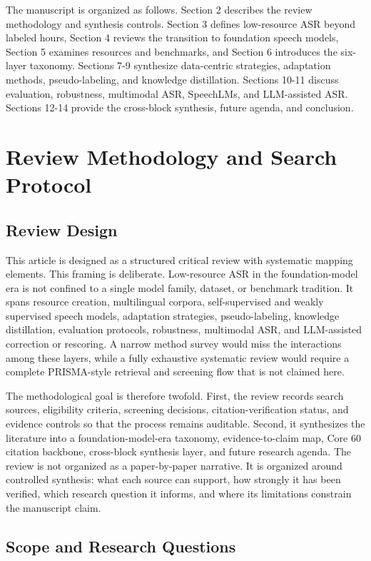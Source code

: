 \documentclass[pdflatex,sn-basic]{sn-jnl}
\theoremstyle{thmstyleone}
\theoremstyle{thmstyletwo}
\theoremstyle{thmstylethree}
\begin{document}
The manuscript is organized as follows. Section 2 describes the review methodology and synthesis controls. Section 3 defines low-resource ASR beyond labeled hours, Section 4 reviews the transition to foundation speech models, Section 5 examines resources and benchmarks, and Section 6 introduces the six-layer taxonomy. Sections 7-9 synthesize data-centric strategies, adaptation methods, pseudo-labeling, and knowledge distillation. Sections 10-11 discuss evaluation, robustness, multimodal ASR, SpeechLMs, and LLM-assisted ASR. Sections 12-14 provide the cross-block synthesis, future agenda, and conclusion.

\section{Review Methodology and Search Protocol}

\subsection{Review Design}

This article is designed as a structured critical review with systematic mapping elements. This framing is deliberate. Low-resource ASR in the foundation-model era is not confined to a single model family, dataset, or benchmark tradition. It spans resource creation, multilingual corpora, self-supervised and weakly supervised speech models, adaptation strategies, pseudo-labeling, knowledge distillation, evaluation protocols, robustness, multimodal ASR, and LLM-assisted correction or rescoring. A narrow method survey would miss the interactions among these layers, while a fully exhaustive systematic review would require a complete PRISMA-style retrieval and screening flow that is not claimed here.

The methodological goal is therefore twofold. First, the review records search sources, eligibility criteria, screening decisions, citation-verification status, and evidence controls so that the process remains auditable. Second, it synthesizes the literature into a foundation-model-era taxonomy, evidence-to-claim map, Core 60 citation backbone, cross-block synthesis layer, and future research agenda. The review is not organized as a paper-by-paper narrative. It is organized around controlled synthesis: what each source can support, how strongly it has been verified, which research question it informs, and where its limitations constrain the manuscript claim.

\subsection{Scope and Research Questions}
\end{document}
